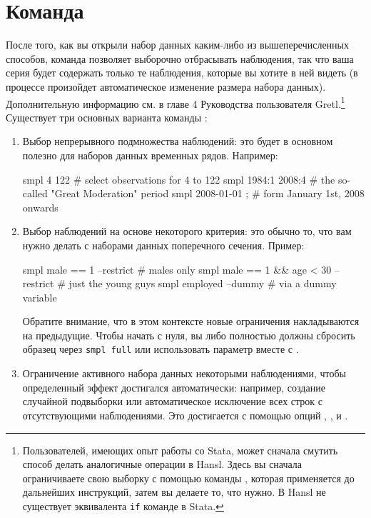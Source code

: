 \section{Команда }

После того, как вы открыли набор данных каким-либо из
вышеперечисленных способов, команда  позволяет выборочно
отбрасывать наблюдения, так что ваша серия будет содержать только те
наблюдения, которые вы хотите в ней видеть (в процессе произойдет
автоматическое изменение размера набора данных). Дополнительную
информацию см. в главе 4 Руководства пользователя
Gretl.\footnote{Пользователей, имеющих опыт работы со Stata, может
  сначала смутить способ делать аналогичные операции в Hansl. Здесь вы
  сначала ограничиваете свою выборку с помощью команды ,
  которая применяется до дальнейших инструкций, затем вы делаете то,
  что нужно. В Hansl не существует эквивалента \texttt{if} команде в
  Stata. }  Существует три основных варианта команды :

\begin{enumerate}
\item Выбор непрерывного подмножества наблюдений: это будет в основном
  полезно для наборов данных временных рядов. Например:

  \begin{code}
    smpl 4 122            # select observations for 4 to 122
    smpl 1984:1 2008:4    # the so-called "Great Moderation" period
    smpl 2008-01-01 ;     # form January 1st, 2008 onwards
  \end{code}
\item Выбор наблюдений на основе некоторого критерия: это обычно то,
  что вам нужно делать с наборами данных поперечного сечения. Пример:
  \begin{code}
    smpl male == 1 --restrict                # males only
    smpl male == 1 && age < 30 --restrict    # just the young guys
    smpl employed --dummy                    # via a dummy variable
  \end{code}
  Обратите внимание, что в этом контексте новые ограничения
  накладываются на предыдущие. Чтобы начать с нуля, вы либо полностью
  должны сбросить образец через \texttt{smpl full} или использовать
  параметр  вместе с .
\item Ограничение активного набора данных некоторыми наблюдениями,
  чтобы определенный эффект достигался автоматически: например,
  создание случайной подвыборки или автоматическое исключение всех
  строк с отсутствующими наблюдениями. Это достигается с помощью опций
  , , и .
\end{enumerate}

